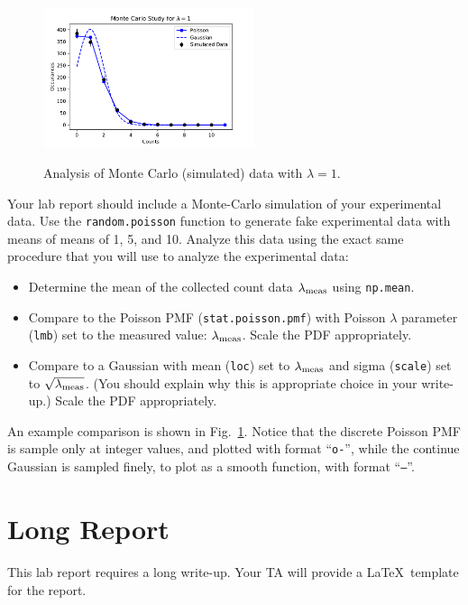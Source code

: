 \documentclass[12pt]{article}
\begin{document}
\begin{figure}[htbp]
\begin{center}
{\includegraphics[width=0.55\textwidth]{figs/montecarlo_eg.pdf}}
\end{center}
\caption{\label{fig:mceg} Analysis of Monte Carlo (simulated) data with $\lambda = 1$.}
\end{figure}

Your lab report should include a Monte-Carlo simulation of your experimental data.  Use the {\tt random.poisson} function to generate fake experimental data with means of means of 1, 5, and 10.
Analyze this data using the exact same procedure that you will use to analyze the experimental data:
\begin{itemize}
 \item Determine the mean of the collected count data $\lambda_{\rm meas}$ using {\tt np.mean}.
 \item Compare to the Poisson PMF ({\tt stat.poisson.pmf}) with Poisson $\lambda$ parameter ({\tt lmb})  set to the measured value:  $\lambda_{\rm meas}$.  Scale the PDF appropriately.
 \item Compare to  a Gaussian with mean ({\tt loc}) set to $\lambda_{\rm meas}$ and sigma ({\tt scale}) set to $\sqrt{\lambda_{\rm meas}}$.  (You should explain why this is appropriate choice in your write-up.)  Scale the PDF appropriately.
\end{itemize}
An example comparison is shown in Fig.~\ref{fig:mceg}.  Notice that the discrete Poisson PMF is sample only at integer values, and plotted with format ``{\tt o-}'', while the continue Gaussian is sampled finely, to plot as a smooth function, with format ``{\tt --}''.

\section{Long Report}

This lab report requires a long write-up.  Your TA will provide a LaTeX~template for the report.  
\end{document}
